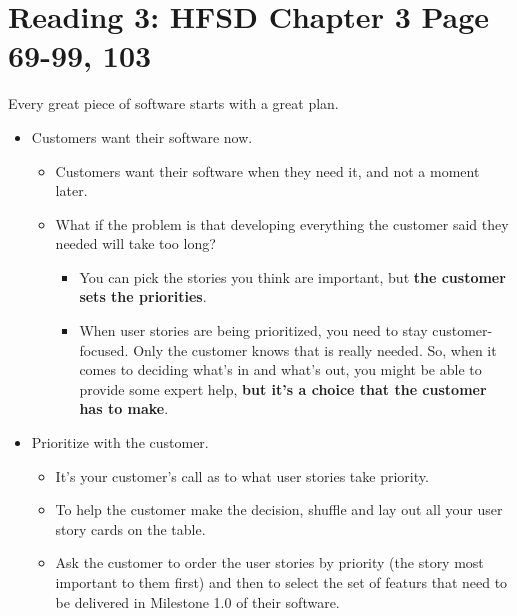 \documentclass[letterpaper]{article}
\begin{document}
\section{Reading 3: HFSD Chapter 3 Page 69-99, 103}
Every great piece of software starts with a great plan. 

\begin{itemize}
    \item Customers want their software now. 
    \begin{itemize}
        \item Customers want their software when they need it, and not a moment later. 
        \item What if the problem is that developing everything the customer said they needed will take too long? 
        \begin{itemize}
            \item You can pick the stories you think are important, but \textbf{the customer sets the priorities}. 
            \item When user stories are being prioritized, you need to stay customer-focused. Only the customer knows that is really needed. So, when it comes to deciding what's in and what's out, you might be able to provide some expert help, \textbf{but it's a choice that the customer has to make}. 
        \end{itemize}
    \end{itemize}

    \item Prioritize with the customer. 
    \begin{itemize}
        \item It's your customer's call as to what user stories take priority. 
        \item To help the customer make the decision, shuffle and lay out all your user story cards on the table. 
        \item Ask the customer to order the user stories by priority (the story most important to them first) and then to select the set of featurs that need to be delivered in Milestone 1.0 of their software. 
    \end{itemize}
    

\end{itemize}
\end{document}
